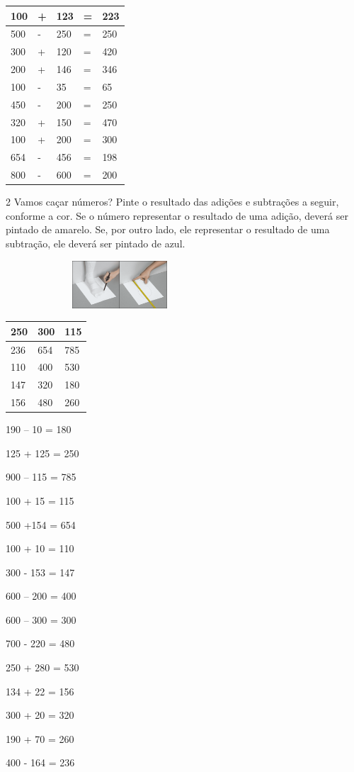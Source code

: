 \begin{longtable}[]{@{}lllll@{}}
\toprule
100 & + & 123 & = & 223\tabularnewline
\midrule
\endhead
500 & - & 250 & = & 250\tabularnewline
300 & + & 120 & = & 420\tabularnewline
200 & + & 146 & = & 346\tabularnewline
100 & - & 35 & = & 65\tabularnewline
450 & - & 200 & = & 250\tabularnewline
320 & + & 150 & = & 470\tabularnewline
100 & + & 200 & = & 300\tabularnewline
654 & - & 456 & = & 198\tabularnewline
800 & - & 600 & = & 200\tabularnewline
\bottomrule
\end{longtable}

\num{2} Vamos caçar números? Pinte o resultado das adições e subtrações a seguir,
conforme a cor. Se o número representar o resultado de uma adição, deverá ser pintado de amarelo. Se, por outro lado, ele representar o resultado de uma subtração, ele deverá ser pintado de azul.

\includegraphics[width=3.35417in,height=0.69792in]{media/image29.png}

\begin{longtable}[]{@{}lll@{}}
\toprule
250 & 300 & 115\tabularnewline
\midrule
\endhead
236 & 654 & 785\tabularnewline
110 & 400 & 530\tabularnewline
147 & 320 & 180\tabularnewline
156 & 480 & 260\tabularnewline
\bottomrule
\end{longtable}


190 -- 10 = 180

125 + 125 = 250

900 -- 115 = 785

100 + 15 = 115

500 +154 = 654

100 + 10 = 110

300 - 153 = 147

600 -- 200 = 400

600 -- 300 = 300

700 - 220 = 480

250 + 280 = 530

134 + 22 = 156

300 + 20 = 320

190 + 70 = 260

400 - 164 = 236


